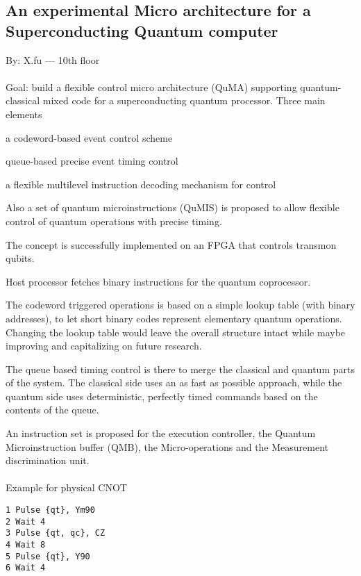 \subsection*{An experimental Micro architecture for a Superconducting Quantum computer}
By: X.fu --- 10th floor\\
\\
Goal: build a flexible control micro architecture (QuMA) supporting  quantum-classical mixed code for a superconducting quantum processor. Three main elements

\begin{s_enumerate}
 \item a codeword-based event control scheme
 \item queue-based precise event timing control
 \item a flexible multilevel instruction decoding mechanism for control
\end{s_enumerate}
Also a set of quantum microinstructions (QuMIS) is proposed to allow flexible control of quantum operations with precise timing.

The concept is successfully implemented on an FPGA that controls transmon qubits.

Host processor fetches binary instructions for the quantum coprocessor.

The codeword triggered operations is based on a simple lookup table (with binary addresses), to let short binary codes represent elementary quantum operations. Changing the lookup table would leave the overall structure intact while maybe improving and capitalizing on future research.

The queue based timing control is there to merge the classical and quantum parts of the system. The classical side uses an as fast as possible approach, while the quantum side uses deterministic, perfectly timed commands based on the contents of the queue. 

An instruction set is proposed for the execution controller, the Quantum Microinstruction buffer (QMB), the Micro-operations and the Measurement discrimination unit.\\
\\
Example for physical CNOT
\begin{lstlisting}
1 Pulse {qt}, Ym90 
2 Wait 4 
3 Pulse {qt, qc}, CZ 
4 Wait 8 
5 Pulse {qt}, Y90 
6 Wait 4
\end{lstlisting}